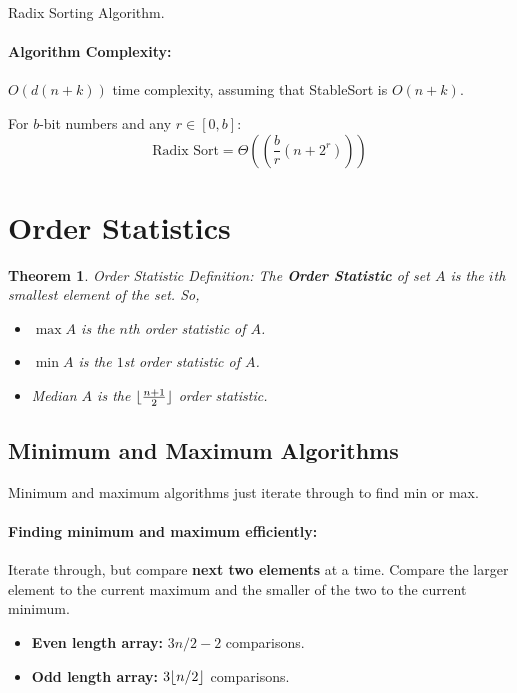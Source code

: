 \documentclass[a4paper,12pt]{report}
\newtheorem{theorem}{Theorem}
\DeclarePairedDelimiter{\floor}{\lfloor}{\rfloor}
\begin{document}
\begin{algorithm}[H]
\SetAlgoLined
{}
	\BlankLine
	\BlankLine

	\caption{Radix Sorting Algorithm.}
\end{algorithm}

\paragraph{Algorithm Complexity: } $O(d(n+k))$ time complexity, assuming that StableSort is $O(n+k)$.


For $b$-bit numbers and any $r\in [0,b]$: 
$$\text{Radix Sort} = \Theta((\frac{b}{r} (n+2^r)))$$


\section{Order Statistics}

\begin{theorem}{Order Statistic Definition:}
The \textbf{Order Statistic} of set $A$ is the $i$th smallest element of the set. So,
\begin{itemize}
\item $\max A$ is the $n$th order statistic of $A$.
\item $\min A$ is the $1$st order statistic of $A$.
\item Median $A$ is the $\floor{\frac{n+1}{2}}$ order statistic. 
\end{itemize}
\end{theorem}


\subsection{Minimum and Maximum Algorithms}

Minimum and maximum algorithms just iterate through to find min or max. 

\paragraph{Finding minimum and maximum efficiently: } Iterate through, but compare \textbf{next two elements} at a time. Compare the larger element to the current maximum and the smaller of the two to the current minimum.
\begin{itemize}
\item \textbf{Even length array: } $3n/2-2$ comparisons.
\item \textbf{Odd length array: } $3\floor{n/2}$ comparisons.
\end{itemize}
\end{document}

